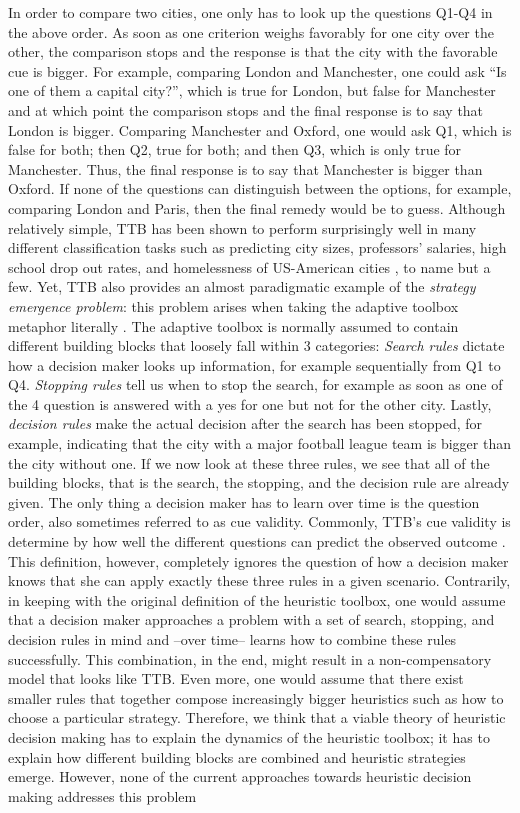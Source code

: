 \documentclass[a4paper,man, natbib]{apa6}
\begin{document}
In order to compare two cities, one only has to look up the questions Q1-Q4 in the above order. As soon as one criterion weighs favorably for one city over the other, the comparison stops and the response is that the city with the favorable cue is bigger. For example, comparing London and Manchester, one could ask ``Is one of them a capital city?'', which is true for London, but false for Manchester and at which point the comparison stops and the final response is to say that London is bigger. Comparing Manchester and Oxford, one would ask Q1, which is false for both; then Q2, true for both; and then Q3, which is only true for Manchester. Thus, the final response is to say that Manchester is bigger than Oxford. If none of the questions can distinguish between the options, for example, comparing London and Paris, then the final remedy would be to guess. Although relatively simple, TTB has been shown to perform surprisingly well in many different classification tasks such as predicting city sizes, professors' salaries, high school drop out rates, and homelessness of US-American cities \citep{gigerenzer1999simple}, to name but a few. Yet, TTB also provides an almost paradigmatic example of the \emph{strategy emergence problem}: this problem arises when taking the adaptive toolbox metaphor literally \citep{gigerenzer2011heuristic}. The adaptive toolbox is normally assumed to contain different building blocks that loosely fall within 3 categories: \emph{Search rules} dictate how a decision maker looks up information, for example sequentially from Q1 to Q4. \emph{Stopping rules} tell us when to stop the search, for example as soon as one of the 4 question is answered with a yes for one but not for the other city. Lastly, \emph{decision rules} make the actual decision after the search has been stopped, for example, indicating that the city with a major football league team is bigger than the city without one. If we now look at these three rules, we see that all of the building blocks, that is the search, the stopping, and the decision rule are already given. The only thing a decision maker has to learn over time is the question order, also sometimes referred to as cue validity. Commonly, TTB's cue validity is determine by how well the different questions can predict the observed outcome \citep{broder2000assessing}. This definition, however, completely ignores the question of how a decision maker knows that she can apply exactly these three rules in a given scenario. Contrarily, in keeping with the original definition of the heuristic toolbox, one would assume that a decision maker approaches a problem with a set of search, stopping, and decision rules in mind and --over time-- learns how to combine these rules successfully. This combination, in the end, might result in a non-compensatory model that looks like TTB. Even more, one would assume that there exist smaller rules that together compose increasingly bigger heuristics such as how to choose a particular strategy. Therefore, we think that a viable theory of heuristic decision making has to explain the dynamics of the heuristic toolbox; it has to explain how different building blocks are combined and heuristic strategies emerge. However, none of the current approaches towards heuristic decision making addresses this problem 
\end{document}
